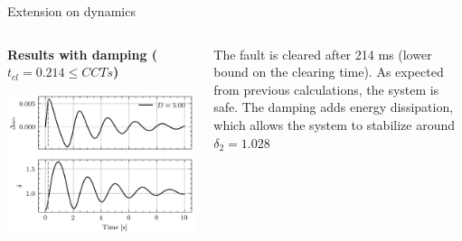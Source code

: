 \begin{frame} {Extension on dynamics}
\begin{columns}
    \begin{column}{0.55\textwidth}
        \textbf{Results with damping ($t_{cl} = 0.214 \leq CCTs$)}
        \begin{center}
        \includegraphics[width=0.9\linewidth]{images/P-dynamics_bis.png}
        \end{center}
    \end{column}
    \begin{column}{0.45\textwidth}
        The fault is cleared after 214 ms (lower bound on the clearing time). As expected from previous calculations, the system is safe. The damping adds energy dissipation, which allows the system to stabilize around $\delta_2 = 1.028$
    \end{column}
\end{columns}
\end{frame}


